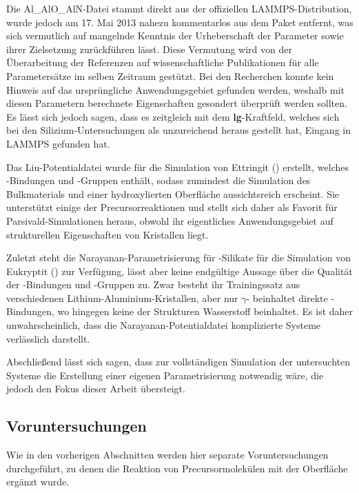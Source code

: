 Die Al\_AlO\_AlN-Datei stammt direkt aus der offiziellen LAMMPS-Distribution, wurde jedoch am 17. Mai 2013 nahezu kommentarlos aus dem Paket entfernt, was sich vermutlich auf mangelnde Kenntnis der Urheberschaft der Parameter sowie ihrer Zielsetzung zurückführen lässt.
Diese Vermutung wird von der Überarbeitung der Referenzen auf wissenschaftliche Publikationen für alle Parametersätze im selben Zeitraum gestützt.
Bei den Recherchen konnte kein Hinweis auf das ursprüngliche Anwendungsgebiet gefunden werden, weshalb mit diesen Parametern berechnete Eigenschaften gesondert überprüft werden sollten.
Es lässt sich jedoch sagen, dass es zeitgleich mit dem \textbf{lg}-Kraftfeld, welches sich bei den Silizium-Untersuchungen als unzureichend heraus gestellt hat, Eingang in LAMMPS gefunden hat.

Das Liu-Potentialdatei wurde für die Simulation von Ettringit () erstellt, welches -Bindungen und -Gruppen enthält, sodass zumindest die Simulation des Bulkmaterials und einer hydroxylierten Oberfläche aussichtsreich erscheint.
Sie unterstützt einige der Precursorreaktionen und stellt sich daher als Favorit für Parsivald-Simulationen heraus, obwohl ihr eigentliches Anwendungsgebiet auf strukturellen Eigenschaften von Kristallen liegt.

Zuletzt steht die Narayanan-Parametrisierung für -Silikate für die Simulation von Eukryptit () zur Verfügung, lässt aber keine endgültige Aussage über die Qualität der -Bindungen und -Gruppen zu.
Zwar besteht ihr Trainingssatz aus verschiedenen Lithium-Aluminium-Kristallen, aber nur $\gamma$- beinhaltet direkte -Bindungen, wo hingegen keine der Strukturen Wasserstoff beinhaltet.
Es ist daher unwahrscheinlich, dass die Narayanan-Potentialdatei komplizierte Systeme verlässlich darstellt.

Abschließend lässt sich sagen, dass zur vollständigen Simulation der untersuchten Systeme die Erstellung einer eigenen Parametrisierung notwendig wäre, die jedoch den Fokus dieser Arbeit übersteigt.

\subsection{Voruntersuchungen}

Wie in den vorherigen Abschnitten werden hier separate Voruntersuchungen durchgeführt, zu denen die Reaktion von Precursormolekülen mit der Oberfläche ergänzt wurde.

